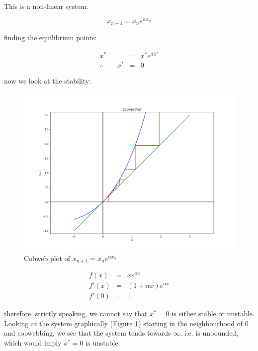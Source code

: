 \documentclass{report}
\begin{document}
This is a non-linear system. \bigskip

\[
    x_{n + 1} = x_n e^{\alpha x_n}
\]\medskip

finding the equilibrium points: \bigskip

\begin{eqnarray*}
                       x^* & = & x^* e^{\alpha x^*} \\
     \therefore \qquad x^* & = & 0
\end{eqnarray*}\medskip

now we look at the stability: \bigskip

\begin{figure}[h]
	\centering
	\includegraphics[scale = 0.4]{cobweb_03}
	\caption{Cobweb plot of $x_{n + 1} = x_n e^{\alpha x_n}$}
	\label{fig:cobweb_03}
\end{figure}\medskip

\begin{eqnarray*}
     f(x) & = & x e^{\alpha x} \\
    f'(x) & = & (1 + \alpha x) e^{\alpha x} \\
	f'(0) & = & 1
\end{eqnarray*}\medskip

therefore, strictly speaking, we cannot say that $x^* = 0$ is either stable or unstable.
Looking at the system graphically (Figure \ref{fig:cobweb_03}) starting in the
neighbourhood of $0$ and cobwebbing, we see that the system tends towards $\infty$, i.e.
is unbounded, which would imply $x^* = 0$ is unstable. \bigskip
\end{document}
